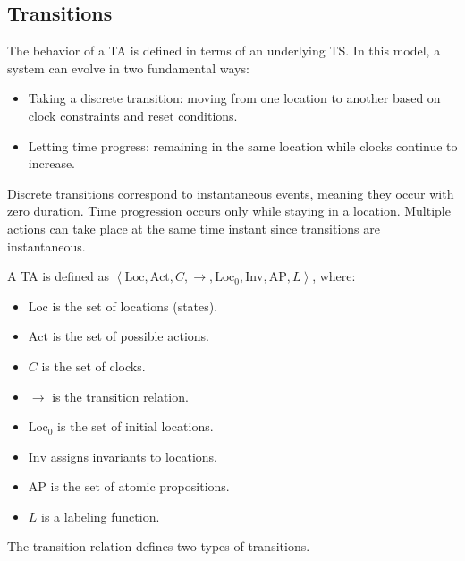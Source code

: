 \subsection{Transitions}
The behavior of a TA is defined in terms of an underlying TS. 
In this model, a system can evolve in two fundamental ways:
\begin{itemize}
    \item Taking a discrete transition: moving from one location to another based on clock constraints and reset conditions.
    \item Letting time progress: remaining in the same location while clocks continue to increase.
\end{itemize}
\noindent Discrete transitions correspond to instantaneous events, meaning they occur with zero duration.
Time progression occurs only while staying in a location.
Multiple actions can take place at the same time instant since transitions are instantaneous.
\begin{definition}
    A TA is defined as $\left\langle \text{Loc}, \text{Act}, C, \rightarrow, \text{Loc}_0, \text{Inv}, \text{AP},L\right\rangle$, where: 
    \begin{itemize}
        \item $\text{Loc}$ is the set of locations (states).
        \item $\text{Act}$ is the set of possible actions.
        \item $C$ is the set of clocks.
        \item $\rightarrow$ is the transition relation.
        \item $\text{Loc}_0$ is the set of initial locations.
        \item $\text{Inv}$ assigns invariants to locations.
        \item $\text{AP}$ is the set of atomic propositions.
        \item $L$ is a labeling function.
    \end{itemize}
\end{definition}
\noindent The transition relation defines two types of transitions.

